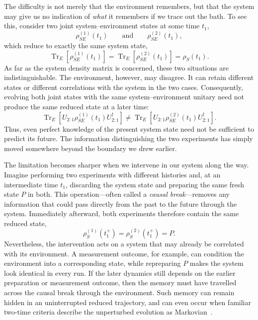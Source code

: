 The difficulty is not merely that the environment remembers, but that the system may give us no indication of \emph{what} it remembers if we trace out the bath.
To see this, consider two joint system--environment states at some time $t_1$,
%
\begin{equation}
    \rho_{SE}^{(1)}(t_1) \qquad\text{and}\qquad \rho_{SE}^{(2)}(t_1),
\end{equation}
%
which reduce to exactly the same system state,
%
\begin{equation}
    \operatorname{Tr}_E\!\left[\rho_{SE}^{(1)}(t_1)\right]
    = \operatorname{Tr}_E\!\left[\rho_{SE}^{(2)}(t_1)\right]
    = \rho_S(t_1).
\end{equation}
%
As far as the system density matrix is concerned, these two situations are indistinguishable.
The environment, however, may disagree.
It can retain different states or different correlations with the system in the two cases.
Consequently, evolving both joint states with the same system--environment unitary need not produce the same reduced state at a later time:
%
\begin{equation}
    \operatorname{Tr}_E\!\left[
    U_{2:1}\rho_{SE}^{(1)}(t_1)U_{2:1}^{\dagger} \right] \neq \operatorname{Tr}_E\!\left[
    U_{2:1}\rho_{SE}^{(2)}(t_1)U_{2:1}^{\dagger} \right].
\end{equation}
%
Thus, even perfect knowledge of the present system state need not be sufficient to predict its future.
The information distinguishing the two experiments has simply moved somewhere beyond the boundary we drew earlier.

The limitation becomes sharper when we intervene in our system along the way.
Imagine performing two experiments with different histories and, at an intermediate time $t_1$, discarding the system state and preparing the same fresh state $P$ in both.
This operation---often called a \emph{causal break}---removes any information that could pass directly from the past to the future through the system.
Immediately afterward, both experiments therefore contain the same reduced state,
%
\begin{equation}
    \rho_S^{(1)}(t_1^+)
    = \rho_S^{(2)}(t_1^+)
    = P.
\end{equation}
%
Nevertheless, the intervention acts on a system that may already be correlated with its environment.
A measurement outcome, for example, can condition the environment into a corresponding state, while repreparing $P$ makes the system look identical in every run.
If the later dynamics still depends on the earlier preparation or measurement outcome, then the memory must have travelled across the causal break through the environment.
Such memory can remain hidden in an uninterrupted reduced trajectory, and can even occur when familiar two-time criteria describe the unperturbed evolution as Markovian~\cite{Pollock2018Markov}.

